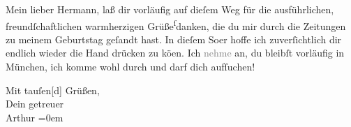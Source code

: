            \vspace{0.5em}
\pstart
           Mein lieber Hermann, laß dir vorläufig auf dieſem Weg für die
               ausführlichen, freundſchaftlichen warmherzigen Grüße\substVorne{}\textsuperscript{ſ}\substDazwischen{}d\substHinten{}anken, die du mir durch die Zeitungen zu meinem Geburtstag geſandt hast. In
               dieſem So{\geminationm}er hoffe ich zuverſichtlich dir
               endlich wieder die Hand drücken zu kö{\geminationn}en. Ich
               \textcolor{gray}{nehme} an, du bleibſt vorläufig in München, {\pb}ich komme wohl durch
               und darf dich aufſuchen!\pend
           
\pstart
           Mit tauſen{[}d{]} Grüßen,{\\[\baselineskip]}Dein getreuer{\\[\baselineskip]}\spacefill\mbox{Arthur}\pend
           \leftskip=0em{}\endnumbering{}  \newcommand{\dateiname}{L02385}\newcommand{\titel}{Arthur Schnitzler an Hermann Bahr, 6. 6. 1922}\newcommand{\editorInnen}{Herausgegeben von Martin Anton Müller}
